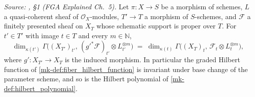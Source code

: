 \begin{lemma}\label{mk-lem:hilbert_fibre_base_change}
  \leanok

  \textit{Source: \cite{nitsure-hilbert-quot}, \S 1 (FGA Explained Ch.~5).}
  Let \(\pi : X \to S\) be a morphism of schemes, \(L\) a quasi-coherent
  sheaf of \(\mathcal{O}_X\)-modules, \(T' \to T\) a morphism of
  \(S\)-schemes, and
  \(\mathcal{F}\) a finitely presented sheaf on \(X_T\) whose schematic
  support is proper over \(T\).  For \(t' \in T'\) with image \(t \in T\)
  and every \(m \in \mathbb{N}\),
  \[
    \dim_{\kappa(t')} \Gamma\bigl((X_{T'})_{t'},\,
      (g'^*\mathcal{F})_{t'} \otimes L_{t'}^{\otimes m}\bigr)
    \;=\;
    \dim_{\kappa(t)} \Gamma\bigl((X_T)_t,\,
      \mathcal{F}_t \otimes L_t^{\otimes m}\bigr),
  \]
  where \(g' : X_{T'} \to X_T\) is the induced morphism.  In particular the
  graded Hilbert function of \ref{mk-def:fiber_hilbert_function} is invariant
  under base change of the parameter scheme, and so is the Hilbert polynomial
  of \ref{mk-def:hilbert_polynomial}.
\end{lemma}
